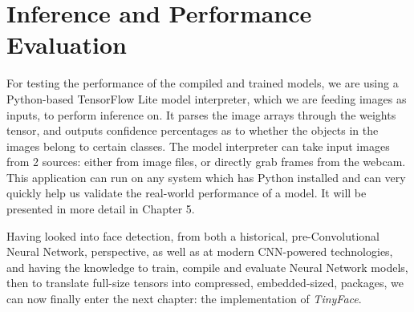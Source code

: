 \section{Inference and Performance Evaluation}
For testing the performance of the compiled and trained models, we are using a Python-based TensorFlow Lite model interpreter, which we are feeding images as inputs, to perform inference on. It parses the image arrays through the weights tensor, and outputs confidence percentages as to whether the objects in the images belong to certain classes. The model interpreter can take input images from 2 sources: either from image files, or directly grab frames from the webcam. This application can run on any system which has Python installed and can very quickly help us validate the real-world performance of a model. It will be presented in more detail in Chapter 5. \par
Having looked into face detection, from both a historical, pre-Convolutional Neural Network, perspective, as well as at modern CNN-powered technologies, and having the knowledge to train, compile and evaluate Neural Network models, then to translate full-size tensors into compressed, embedded-sized, packages, we can now finally enter the next chapter: the implementation of \textit{TinyFace}.
